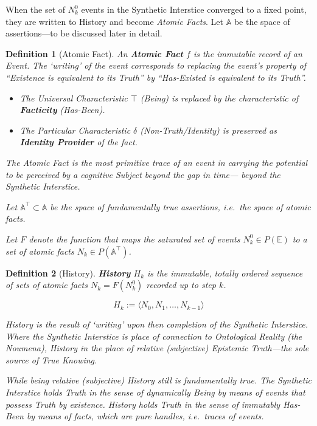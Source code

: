 \documentclass[11pt, a4paper]{article}
\theoremstyle{formalism}
\newtheorem{formalism}{Definition}
\begin{document}
When the set of $N^0_k$ events in the Synthetic Interstice converged to a fixed
point, they are written to History and become {\it Atomic Facts}. Let
$\mathbb{A}$ be the space of assertions---to be discussed later in detail.

\begin{formalism}[Atomic Fact]

    An \textbf{Atomic Fact} $f$ is the immutable record of an Event. The
    `writing' of the event corresponds to replacing the event's property of
    ``{\it Existence\/} is equivalent to its Truth'' by ``{\it Has-Existed\/} is
    equivalent to its Truth''.

    \begin{itemize}
        \item The Universal Characteristic $\top$ (Being) is replaced by the 
              characteristic of \textbf{Facticity} (Has-Been).
        \item The Particular Characteristic $\delta$ (Non-Truth/Identity) is 
              preserved as \textbf{Identity Provider} of the fact.
    \end{itemize}

    The {\it Atomic Fact\/} is the most primitive trace of an event in carrying
    the potential to be perceived by a cognitive Subject beyond the gap in time---
    beyond the Synthetic Interstice.

    Let $\mathbb{A}^\top \subset \mathbb{A}$ be the space of fundamentally 
    {\it true\/} assertions, i.e.\ the space of atomic facts.

    Let $\mathit{F}$ denote the function that maps the saturated set of events 
    $N^0_k \in \mathit{P}(\mathbb{E})$ to a set of atomic facts 
    $N_k\in\mathit{P}(\mathbb{A}^\top)$.

\end{formalism}

\begin{formalism}[History]

    \textbf{History} $H_k$ is the immutable, totally ordered sequence of
    sets of {\it atomic facts\/} $N_k = \mathit{F}(N^0_k)$ recorded up 
    to step $k$.

    \begin{equation}
        H_k := \langle N_0, N_1, \dots, N_{k-1} \rangle
    \end{equation}

    History is the result of `writing' upon then completion of the Synthetic
    Interstice. Where the Synthetic Interstice is place of connection to {\it Ontological
    Reality\/} (the Noumena), History in the place of relative (subjective) 
    {\it Epistemic Truth\/}---the sole source of {\it True Knowing}.
    
    While being relative (subjective) History still is fundamentally true.
    The Synthetic Interstice holds Truth in the sense of dynamically {\it
    Being\/} by means of events that possess Truth by existence. History holds
    Truth in the sense of immutably {\it Has-Been\/} by means of facts, which
    are pure handles, i.e.\ traces of events.

\end{formalism}
\end{document}
